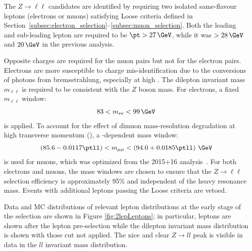 The $Z \rightarrow \ell\ell$ candidates are identified by requiring two isolated same-flavour leptons (electrons or muons) satisfying Loose criteria defined in Section~\ref{subsec:electron_selection}--\ref{subsec:muon_selection}.
Both the leading and sub-leading lepton \pt are required to be $\pt > 27\,\GeV$, while it was $>28\,\GeV$ and $20\,\GeV$ in the previous analysis. 

Opposite charges are required for the muon pairs but not for the electron pairs. Electrons are more susceptible to charge mis-identification due to the conversions of photons from bremsstrahlung, especially at high \et. 
The dilepton invariant mass $m_{\ell\ell}$ is required to be consistent with the $Z$ boson mass. For electrons, a fixed $m_{\ell\ell}$ window:
\begin{equation}
83 < m_{ee} <  99\,\GeV
\end{equation}
is applied.
To account for the effect of dimuon mass-resolution degradation at high transverse momentum (\ptll), a \ptll-dependent mass window:
\begin{equation}
\left(85.6 - 0.0117\ptll\right) < m_{\mu\mu} <  \left(94.0 + 0.0185\ptll\right)\,\GeV
\end{equation}
is used for muons, which was optimized from the 2015+16 analysis~\cite{EXOT-2016-29}. 
For both electrons and muons, the mass windows are chosen to ensure that the $Z \to \ell\ell$ selection efficiency is approximately 95\% and independent of the heavy resonance mass. 
Events with additional leptons passing the Loose criteria are vetoed.

Data and MC distributions of relevant lepton distributions at the early stage 
of the selection are shown in Figure \ref{fig:2lepLeptons}; 
in particular, leptons \pt are shown after the lepton pre-selection 
while the dilepton invariant mass distribution is shown with those cut not applied.
The nice and clear $Z \rightarrow ll$ peak is visible in data in the $ll$ invariant mass distribution.


